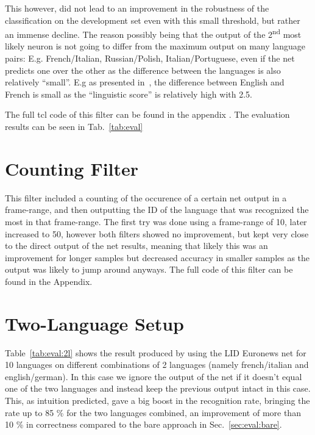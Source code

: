 This however, did not lead to an improvement in the robustness of the classification on the development set even with this small threshold, but rather an immense decline. The reason possibly being that the output of the 2\textsuperscript{nd} most likely neuron is not going to differ from the maximum output on many language pairs: E.g. French/Italian, Russian/Polish, Italian/Portuguese,  even if the net predicts one over the other as the difference between the languages is also relatively ``small''. E.g as presented in~\cite{doi:10.1080/14790710508668395}, the difference between English and French is small as the ``linguistic score'' is relatively high with 2.5. 

The full tcl code of this filter can be found in the appendix . The evaluation results can be seen in Tab.~\ref{tab:eval}

\section{Counting Filter}
This filter included a counting of the occurence of a certain net output in a frame-range, and then outputting the ID of the language that was recognized the most in that frame-range. The first try was done using a  frame-range of 10, later increased to 50, however both filters showed no improvement, but kept very close to the direct output of the net results, meaning that likely this was an improvement for longer samples but decreased accuracy in smaller samples as the output was likely to jump around anyways. The full code of this filter can be found in the Appendix.

\section{Two-Language Setup}
\label{sec:eval:2L}
Table~\ref{tab:eval:2l} shows the result produced by using the LID Euronews net for 10 languages on different combinations of 2 languages (namely french/italian and english/german). In this case we ignore the output of the net if it doesn't equal one of the two languages and instead keep the previous output intact in this case. This, as intuition predicted, gave a big boost in the recognition rate, bringing the rate up to 85 \% for the two languages combined, an improvement of more than 10 \% in correctness compared to the bare approach in Sec.~\ref{sec:eval:bare}.

